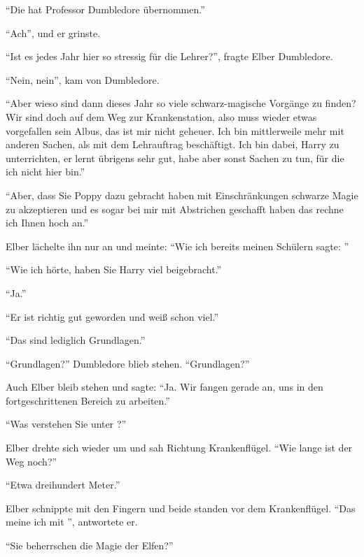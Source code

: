 \enquote{Die hat Professor Dumbledore übernommen.}

\enquote{Ach}, und er grinste.

\trenn

\enquote{Ist es jedes Jahr hier so stressig für die Lehrer?}, fragte Elber Dumbledore.

\enquote{Nein, nein}, kam von Dumbledore.

\enquote{Aber wieso sind dann dieses Jahr so viele schwarz-magische Vorgänge zu finden? Wir sind doch auf dem Weg zur Krankenstation, also muss wieder etwas vorgefallen sein \gst Albus, das ist mir nicht geheuer. Ich bin mittlerweile mehr mit anderen Sachen, als mit dem Lehrauftrag beschäftigt. Ich bin dabei, Harry zu unterrichten, er lernt übrigens sehr gut, habe aber sonst Sachen zu tun, für die ich nicht hier bin.}

\enquote{Aber, dass Sie Poppy dazu gebracht haben mit Einschränkungen schwarze Magie zu akzeptieren und es sogar bei mir mit Abstrichen geschafft haben \gst das rechne ich Ihnen hoch an.}

Elber lächelte ihn nur an und meinte: \enquote{Wie ich bereits meinen Schülern sagte: }

\enquote{Wie ich hörte, haben Sie Harry viel beigebracht.}

\enquote{Ja.}

\enquote{Er ist richtig gut geworden und weiß schon viel.}

\enquote{Das sind lediglich Grundlagen.}

\enquote{Grundlagen?} Dumbledore blieb stehen. \enquote{Grundlagen?}

Auch Elber bleib stehen und sagte: \enquote{Ja. Wir fangen gerade an, uns in den fortgeschrittenen Bereich zu arbeiten.}

\enquote{Was verstehen Sie unter ?}

Elber drehte sich wieder um und sah Richtung Krankenflügel. \enquote{Wie lange ist der Weg noch?}

\enquote{Etwa dreihundert Meter.}

Elber schnippte mit den Fingern und beide standen vor dem Krankenflügel. \enquote{Das meine ich mit }, antwortete er.

\enquote{Sie beherrschen die Magie der Elfen?}

